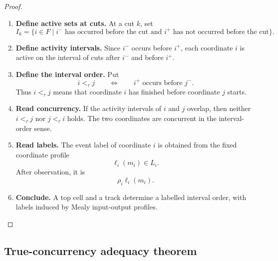\begin{proof}
    \leavevmode
    \begin{enumerate}
        \item \textbf{Define active sets at cuts.}
        At a cut \(k\), set
        \[
            I_k
            =
            \{i\in F\mid i^- \text{ has occurred before the cut and } i^+
            \text{ has not occurred before the cut}\}.
        \]

        \item \textbf{Define activity intervals.}
        Since \(i^-\) occurs before \(i^+\), each coordinate \(i\) is active
        on the interval of cuts after \(i^-\) and before \(i^+\).

        \item \textbf{Define the interval order.}
        Put
        \[
            i<_{\tau}j
            \qquad\Longleftrightarrow\qquad
            i^+\text{ occurs before }j^-.
        \]
        Thus \(i<_{\tau}j\) means that coordinate \(i\) has finished before
        coordinate \(j\) starts.

        \item \textbf{Read concurrency.}
        If the activity intervals of \(i\) and \(j\) overlap, then neither
        \(i<_{\tau}j\) nor \(j<_{\tau}i\) holds. The two coordinates are
        concurrent in the interval-order sense.

        \item \textbf{Read labels.}
        The event label of coordinate \(i\) is obtained from the fixed
        coordinate profile
        \[
            \ell_i(m_i)\in L_i.
        \]
        After observation, it is
        \[
            \rho_i\ell_i(m_i).
        \]

        \item \textbf{Conclude.}
        A top cell and a track determine a labelled interval order, with
        labels induced by Mealy input-output profiles.
    \end{enumerate}
\end{proof}

\subsection{True-concurrency adequacy theorem}
\label{subsec:cmett-true-concurrency-adequacy-theorem}


